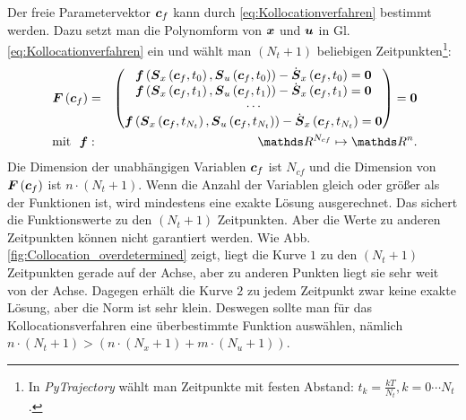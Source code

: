 Der freie Parametervektor $\boldsymbol c_{f}$ kann durch \eqref{eq:Kollocationverfahren} bestimmt werden. Dazu setzt man die Polynomform von $\boldsymbol x$ und $\boldsymbol u$ in Gl. \eqref{eq:Kollocationverfahren} ein und wählt man $(N_{t}+1)$ beliebigen Zeitpunkten\footnote{In \emph{PyTrajectory} wählt man Zeitpunkte mit festen Abstand: $t_{k} = \frac{kT}{N_{t}}, k = 0 \cdots N_{t}$.}:
\begin{eqnarray}
\vect{F\left (  \vect{c}_{f} \right )}&=&\begin{pmatrix}
\vect{f}\left ( \vect{S}_{x}\left ( \vect{c}_{f},t_{0} \right ), \vect{S}_{u}\left ( \vect{c}_{f},t_{0} \right ) \right )-\dot{\vect{S}}_{x}\left ( \vect{c}_f,t_{0} \right ) = \vect{0}\\
\vect{f}\left ( \vect{S}_{x}\left ( \vect{c}_{f},t_{1} \right ), \vect{S}_{u}\left ( \vect{c}_{f},t_{1} \right ) \right )-\dot{\vect{S}}_{x}\left ( \vect{c}_f,t_{1} \right ) = \vect{0}\\
\cdots  
\\
\vect{f}\left ( \vect{S}_{x}\left ( \vect{c}_{f},t_{N_{t}} \right ), \vect{S}_{u}\left ( \vect{c}_{f},t_{N_{t}} \right ) \right )-\dot{\vect{S}}_{x}\left ( \vect{c}_f,t_{N_{t}} \right ) = \vect{0}
\end{pmatrix}=\vect{0}\\ ~\text{mit}~~\vect{f}&:& \Reals^{N_{cf}}\mapsto \Reals^{n}\notag.
\label{eq:Gesamte_Funktion_von_KollocationVerfahren}
\end{eqnarray}
Die Dimension der unabhängigen Variablen $\boldsymbol c_{f}$ ist $N_{cf}$ und die Dimension von $\boldsymbol F\left (  \boldsymbol c_{f} \right )$ ist $n\cdot(N_{t}+1)$. Wenn die Anzahl der Variablen gleich oder größer als der Funktionen ist, wird mindestens eine exakte Lösung ausgerechnet. Das sichert die Funktionswerte zu den $(N_{t}+1)$ Zeitpunkten. Aber die Werte zu anderen Zeitpunkten können nicht garantiert werden.  Wie Abb. \ref{fig:Collocation_overdetermined} zeigt, liegt die Kurve $1$ zu den $(N_{t}+1)$ Zeitpunkten gerade auf der Achse, aber zu anderen Punkten liegt sie sehr weit von der Achse. Dagegen erhält die Kurve $2$ zu jedem Zeitpunkt zwar keine exakte Lösung, aber die Norm ist sehr klein. Deswegen sollte man für das Kollocationsverfahren eine überbestimmte Funktion auswählen, nämlich $n\cdot(N_{t}+1)>(n\cdot (N_{x}+1) + m \cdot (N_{u}+1))$.
